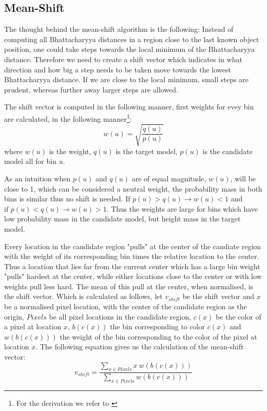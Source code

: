\documentclass[a4paper,11pt]{article}
\begin{document}
\subsection{Mean-Shift}

The thought behind the mean-shift algorithm is the following: Instead of computing all Bhattacharyya distances in a region close to the last known object position, one could take steps towards the local minimum of the Bhattacharyya distance. Therefore we need to create a shift vector which indicates in what direction and how big a step needs to be taken move towards the lowest Bhattacharyya distance. If we are close to the local minimum, small steps are prudent, whereas further away larger steps are allowed. 

The shift vector is computed in the following manner, first weights for evey bin are calculated, in the following manner\footnote{For the derivation we refer to \cite{mean_shift}\label{fn:derivation_refer}}:
\begin{equation}
\label{eq:weights}
w(u) = \sqrt{\frac{q(u)}{p(u)}}
\end{equation} %
where $w(u)$ is the weight, $q(u)$ is the target model, $p(u)$ is the candidate model all for bin $u$.

As an intuition when $p(u)$ and $q(u)$ are of equal magnitude, $w(u)$, will be close to 1, which can be considered a neutral weight, the probability mass in both bins is similar thus no shift is needed. $\textrm{If }p(u) > q(u) \rightarrow w(u) < 1$ and $\textrm{if }p(u) < q(u) \rightarrow w(u) > 1$. Thus the weights are large for bins  which have low probability mass in the candidate model, but height mass in the target model. 

Every location in the candidate region "pulls" at the center of the candiate region with the weight of its corresponding bin times the relative location to the center. Thus a location that lies far from the current center which has a large bin weight "pulls" hardest at the center, while either locations close to the center or with low weights pull less hard. The mean of this pull at the center, when normalised, is the shift vector. Which is calculated as follows, let $v_{shift}$ be the shift vector and $x$ be a normalised pixel location, with the center of the candidate region as the origin, $Pixels$ be all pixel locations in the candidate region, $c(x)$ be the color of a pixel at location $x$, $b(c(x))$ the bin corresponding to color $c(x)$ and $w(b(c(x)))$ the weight of the bin corresponding to the color of the pixel at location $x$. The following equation gives us the calculation of the mean-shift vector:
\begin{equation}
\label{eq:shift vector}
v_{shift}=\frac{\sum_{x\in Pixels} x \ w(b(c(x)))}{\sum_{x\in Pixels} w(b(c(x)))}
\end{equation} %
\end{document}
